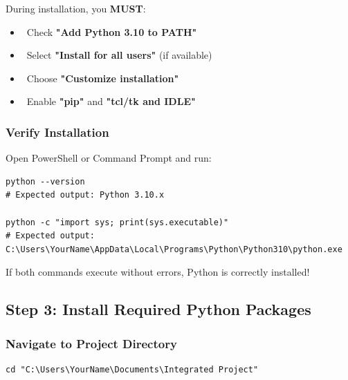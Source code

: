 \documentclass[11pt,a4paper]{article}
\begin{document}
\begin{warningbox}[title=Critical: Installation Settings]
During installation, you \textbf{MUST}:
\begin{itemize}
    \item \faCheckSquare\ Check \textbf{"Add Python 3.10 to PATH"}
    \item \faCheckSquare\ Select \textbf{"Install for all users"} (if available)
    \item \faCheckSquare\ Choose \textbf{"Customize installation"}
    \item \faCheckSquare\ Enable \textbf{"pip"} and \textbf{"tcl/tk and IDLE"}
\end{itemize}
\end{warningbox}

\subsubsection{Verify Installation}

Open PowerShell or Command Prompt and run:

\begin{commandbox}[title=Verification Commands]
\begin{lstlisting}[style=shellstyle]
python --version
# Expected output: Python 3.10.x

python -c "import sys; print(sys.executable)"
# Expected output: C:\Users\YourName\AppData\Local\Programs\Python\Python310\python.exe
\end{lstlisting}
\end{commandbox}

\begin{successbox}[title=Success Indicator]
If both commands execute without errors, Python is correctly installed!
\end{successbox}

\newpage

\subsection{Step 3: Install Required Python Packages}

\subsubsection{Navigate to Project Directory}

\begin{commandbox}[title=Change Directory]
\begin{lstlisting}[style=shellstyle]
cd "C:\Users\YourName\Documents\Integrated Project"
\end{lstlisting}
\end{commandbox}
\end{document}
